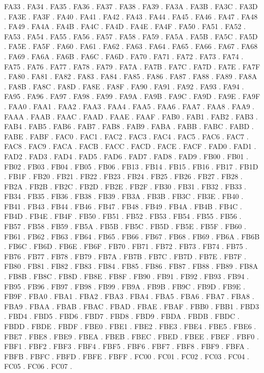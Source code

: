 FA33 .
FA34 .
FA35 .
FA36 .
FA37 .
FA38 .
FA39 .
FA3A .
FA3B .
FA3C .
FA3D .
FA3E .
FA3F .
FA40 .
FA41 .
FA42 .
FA43 .
FA44 .
FA45 .
FA46 .
FA47 .
FA48 .
FA49 .
FA4A .
FA4B .
FA4C .
FA4D .
FA4E .
FA4F .
FA50 .
FA51 .
FA52 .
FA53 .
FA54 .
FA55 .
FA56 .
FA57 .
FA58 .
FA59 .
FA5A .
FA5B .
FA5C .
FA5D .
FA5E .
FA5F .
FA60 .
FA61 .
FA62 .
FA63 .
FA64 .
FA65 .
FA66 .
FA67 .
FA68 .
FA69 .
FA6A .
FA6B .
FA6C .
FA6D .
FA70 .
FA71 .
FA72 .
FA73 .
FA74 .
FA75 .
FA76 .
FA77 .
FA78 .
FA79 .
FA7A .
FA7B .
FA7C .
FA7D .
FA7E .
FA7F .
FA80 .
FA81 .
FA82 .
FA83 .
FA84 .
FA85 .
FA86 .
FA87 .
FA88 .
FA89 .
FA8A .
FA8B .
FA8C .
FA8D .
FA8E .
FA8F .
FA90 .
FA91 .
FA92 .
FA93 .
FA94 .
FA95 .
FA96 .
FA97 .
FA98 .
FA99 .
FA9A .
FA9B .
FA9C .
FA9D .
FA9E .
FA9F .
FAA0 .
FAA1 .
FAA2 .
FAA3 .
FAA4 .
FAA5 .
FAA6 .
FAA7 .
FAA8 .
FAA9 .
FAAA .
FAAB .
FAAC .
FAAD .
FAAE .
FAAF .
FAB0 .
FAB1 .
FAB2 .
FAB3 .
FAB4 .
FAB5 .
FAB6 .
FAB7 .
FAB8 .
FAB9 .
FABA .
FABB .
FABC .
FABD .
FABE .
FABF .
FAC0 .
FAC1 .
FAC2 .
FAC3 .
FAC4 .
FAC5 .
FAC6 .
FAC7 .
FAC8 .
FAC9 .
FACA .
FACB .
FACC .
FACD .
FACE .
FACF .
FAD0 .
FAD1 .
FAD2 .
FAD3 .
FAD4 .
FAD5 .
FAD6 .
FAD7 .
FAD8 .
FAD9 .
FB00 .
FB01 .
FB02 .
FB03 .
FB04 .
FB05 .
FB06 .
FB13 .
FB14 .
FB15 .
FB16 .
FB17 .
FB1D .
FB1F .
FB20 .
FB21 .
FB22 .
FB23 .
FB24 .
FB25 .
FB26 .
FB27 .
FB28 .
FB2A .
FB2B .
FB2C .
FB2D .
FB2E .
FB2F .
FB30 .
FB31 .
FB32 .
FB33 .
FB34 .
FB35 .
FB36 .
FB38 .
FB39 .
FB3A .
FB3B .
FB3C .
FB3E .
FB40 .
FB41 .
FB43 .
FB44 .
FB46 .
FB47 .
FB48 .
FB49 .
FB4A .
FB4B .
FB4C .
FB4D .
FB4E .
FB4F .
FB50 .
FB51 .
FB52 .
FB53 .
FB54 .
FB55 .
FB56 .
FB57 .
FB58 .
FB59 .
FB5A .
FB5B .
FB5C .
FB5D .
FB5E .
FB5F .
FB60 .
FB61 .
FB62 .
FB63 .
FB64 .
FB65 .
FB66 .
FB67 .
FB68 .
FB69 .
FB6A .
FB6B .
FB6C .
FB6D .
FB6E .
FB6F .
FB70 .
FB71 .
FB72 .
FB73 .
FB74 .
FB75 .
FB76 .
FB77 .
FB78 .
FB79 .
FB7A .
FB7B .
FB7C .
FB7D .
FB7E .
FB7F .
FB80 .
FB81 .
FB82 .
FB83 .
FB84 .
FB85 .
FB86 .
FB87 .
FB88 .
FB89 .
FB8A .
FB8B .
FB8C .
FB8D .
FB8E .
FB8F .
FB90 .
FB91 .
FB92 .
FB93 .
FB94 .
FB95 .
FB96 .
FB97 .
FB98 .
FB99 .
FB9A .
FB9B .
FB9C .
FB9D .
FB9E .
FB9F .
FBA0 .
FBA1 .
FBA2 .
FBA3 .
FBA4 .
FBA5 .
FBA6 .
FBA7 .
FBA8 .
FBA9 .
FBAA .
FBAB .
FBAC .
FBAD .
FBAE .
FBAF .
FBB0 .
FBB1 .
FBD3 .
FBD4 .
FBD5 .
FBD6 .
FBD7 .
FBD8 .
FBD9 .
FBDA .
FBDB .
FBDC .
FBDD .
FBDE .
FBDF .
FBE0 .
FBE1 .
FBE2 .
FBE3 .
FBE4 .
FBE5 .
FBE6 .
FBE7 .
FBE8 .
FBE9 .
FBEA .
FBEB .
FBEC .
FBED .
FBEE .
FBEF .
FBF0 .
FBF1 .
FBF2 .
FBF3 .
FBF4 .
FBF5 .
FBF6 .
FBF7 .
FBF8 .
FBF9 .
FBFA .
FBFB .
FBFC .
FBFD .
FBFE .
FBFF .
FC00 .
FC01 .
FC02 .
FC03 .
FC04 .
FC05 .
FC06 .
FC07 .
